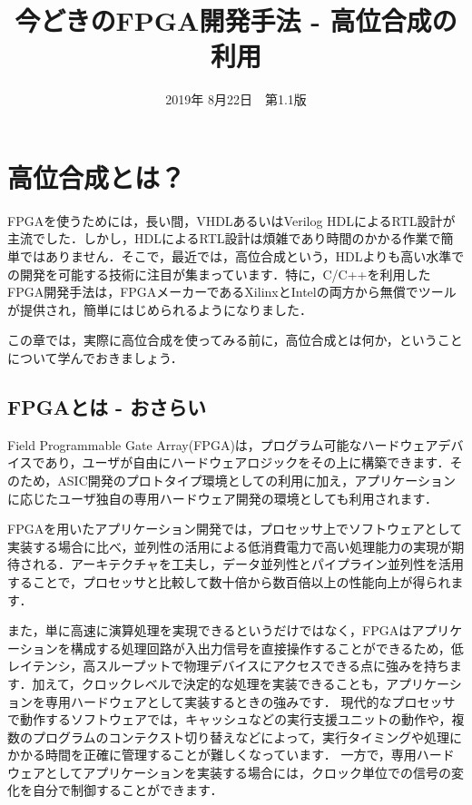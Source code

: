 \documentclass[a4paper,dvipdfmx]{jsarticle}
\begin{document}
\title{今どきのFPGA開発手法 - 高位合成の利用}
\author{}
\date{2019年 8月22日~~第1.1版}
\maketitle

\section{高位合成とは？}\label{sec:overview}

FPGAを使うためには，長い間，VHDLあるいはVerilog HDLによるRTL設計が主流でした．しかし，HDLによるRTL設計は煩雑であり時間のかかる作業で簡単ではありません．そこで，最近では，高位合成という，HDLよりも高い水準での開発を可能する技術に注目が集まっています．特に，C/C++を利用したFPGA開発手法は，FPGAメーカーであるXilinxとIntelの両方から無償でツールが提供され，簡単にはじめられるようになりました．

この章では，実際に高位合成を使ってみる前に，高位合成とは何か，ということについて学んでおきましょう．

\subsection{FPGAとは - おさらい}
Field Programmable Gate Array(FPGA)は，プログラム可能なハードウェアデバイスであり，ユーザが自由にハードウェアロジックをその上に構築できます．そのため，ASIC開発のプロトタイプ環境としての利用に加え，アプリケーションに応じたユーザ独自の専用ハードウェア開発の環境としても利用されます．

FPGAを用いたアプリケーション開発では，プロセッサ上でソフトウェアとして実装する場合に比べ，並列性の活用による低消費電力で高い処理能力の実現が期待される．アーキテクチャを工夫し，データ並列性とパイプライン並列性を活用することで，プロセッサと比較して数十倍から数百倍以上の性能向上が得られます．

また，単に高速に演算処理を実現できるというだけではなく，FPGAはアプリケーションを構成する処理回路が入出力信号を直接操作することができるため，低レイテンシ，高スループットで物理デバイスにアクセスできる点に強みを持ちます．加えて，クロックレベルで決定的な処理を実装できることも，アプリケーションを専用ハードウェアとして実装するときの強みです．
現代的なプロセッサで動作するソフトウェアでは，キャッシュなどの実行支援ユニットの動作や，複数のプログラムのコンテクスト切り替えなどによって，実行タイミングや処理にかかる時間を正確に管理することが難しくなっています．
一方で，専用ハードウェアとしてアプリケーションを実装する場合には，クロック単位での信号の変化を自分で制御することができます．
\end{document}

